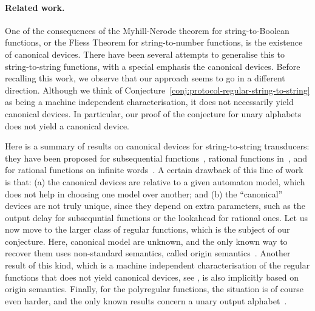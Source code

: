 \paragraph*{Related work.} One of the consequences of the Myhill-Nerode theorem
for string-to-Boolean functions, or the Fliess Theorem for string-to-number
functions, is the existence of  canonical devices. There have been several
attempts to generalise this to string-to-string functions, with a special
emphasis the canonical devices. Before recalling this work, we observe that our
approach seems to go in a  different direction. Although we think of
Conjecture~\ref{conj:protocol-regular-string-to-string} as being a machine
independent characterisation, it does not necessarily  yield canonical devices.
In particular, our proof of the conjecture for unary alphabets does not yield a
canonical device.

Here is a summary of results on canonical devices for string-to-string
transducers: they have been proposed for subsequential functions~\cite[Théorème
1.1]{choffrut1977}, rational functions in~\cite[Theorem
1]{reutenauerSchutzenberger1991},  and for rational functions on infinite
words~\cite[Section 4]{canonicalRational2018}. A certain drawback of this line
of work is that: (a) the canonical devices are relative to a given automaton
model, which does not help in choosing one model over another; and (b) the
``canonical'' devices are not truly unique, since they depend on extra
parameters, such as the output delay for subsequntial functions or the
lookahead for rational ones. Let us now move to the larger class of regular
functions, which is the subject of our conjecture. Here,  canonical model are
unknown, and the only known way to recover them uses non-standard semantics,
called origin semantics~\cite[Theorem
1]{bojanczykTransducersOriginInformation2014}. Another result of this kind,
which is a machine independent characterisation of the regular functions that
does not yield canonical devices, see \cite[Theorem
3.2]{bojanczykTitoRegular23}, is also implicitly based on origin semantics.
Finally, for the polyregular functions, the situation is of course even harder,
and the only known results concern a unary output alphabet~\cite[Section
IV]{Zpolyreg23}.


